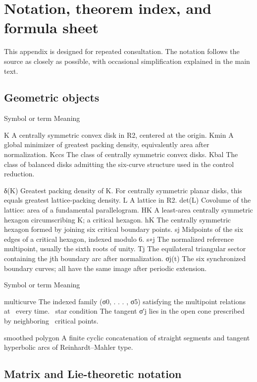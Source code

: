 \chapter{Notation, theorem index, and formula sheet}
This appendix is designed for repeated consultation. The notation follows the source as closely as possible, with occasional simplification explained in the main text.


\section{Geometric objects}

Symbol or term Meaning


K A centrally symmetric convex disk in R2, centered at the origin. Kmin A global minimizer of greatest packing density, equivalently area after normalization. Kccs The class of centrally symmetric convex disks. Kbal The class of balanced disks admitting the six-curve structure used in the control reduction.


δ(K) Greatest packing density of K. For centrally symmetric planar disks, this equals greatest lattice-packing density. L A lattice in R2. det(L) Covolume of the lattice: area of a fundamental parallelogram. HK A least-area centrally symmetric hexagon circumscribing K; a critical hexagon. hK The centrally symmetric hexagon formed by joining six critical boundary points. sj Midpoints of the six edges of a critical hexagon, indexed modulo 6. s∗j The normalized reference multipoint, usually the sixth roots of unity. Tj The equilateral triangular sector containing the jth boundary arc after normalization. σj(t) The six synchronized boundary curves; all have the same image after periodic extension.


Symbol or term Meaning


\begin{displaytext}
multicurve The indexed family (σ0, . . . , σ5) satisfying the multipoint relations at \
every time. \
star condition The tangent σ′j lies in the open cone prescribed by neighboring \
critical points.
\end{displaytext}

smoothed polygon A finite cyclic concatenation of straight segments and tangent hyperbolic arcs of Reinhardt–Mahler type.


\section{Matrix and Lie-theoretic notation}

